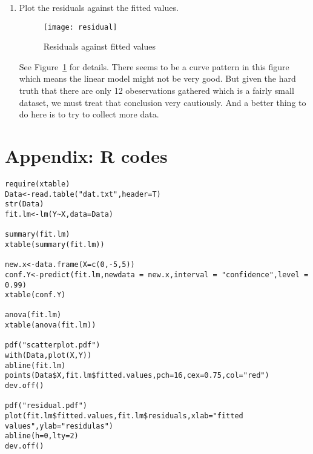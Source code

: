 \documentclass[a4paper,12pt]{article}
\begin{document}
\begin{enumerate}
\item Plot the residuals against the fitted values.
  \begin{figure}[htbp]
    \centering
    \texttt{[image: residual]}
    \caption{Residuals against fitted values}
    \label{fig:residuals}
  \end{figure}
\par
See Figure~\ref{fig:residuals} for details. There seems to be a curve pattern in this figure which means the linear model might not be very good. But given the hard truth that there are only 12 obeservations gathered which is a fairly small dataset, we must treat that conclusion very cautiously. And a better thing to do here is to try to collect more data. 
\end{enumerate}

\clearpage
\appendix
\section*{Appendix: R codes}
\begin{verbatim}
require(xtable)
Data<-read.table("dat.txt",header=T)
str(Data)
fit.lm<-lm(Y~X,data=Data)

summary(fit.lm)
xtable(summary(fit.lm))

new.x<-data.frame(X=c(0,-5,5))
conf.Y<-predict(fit.lm,newdata = new.x,interval = "confidence",level = 0.99)
xtable(conf.Y)

anova(fit.lm)
xtable(anova(fit.lm))

pdf("scatterplot.pdf")
with(Data,plot(X,Y))
abline(fit.lm)
points(Data$X,fit.lm$fitted.values,pch=16,cex=0.75,col="red")
dev.off()

pdf("residual.pdf")
plot(fit.lm$fitted.values,fit.lm$residuals,xlab="fitted values",ylab="residulas")
abline(h=0,lty=2)
dev.off()
\end{verbatim}
\end{document}
